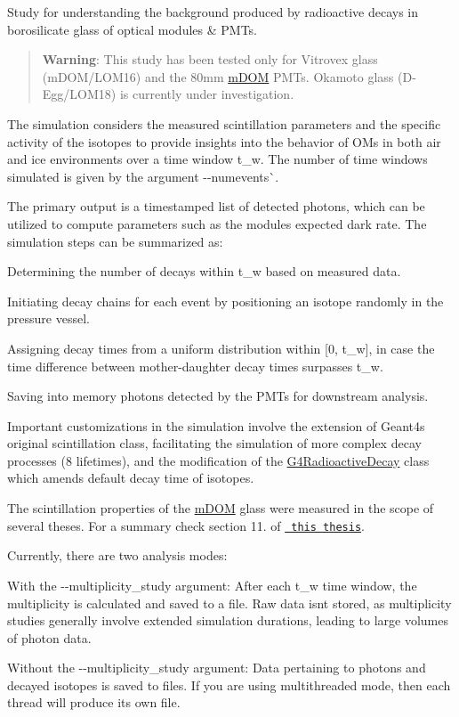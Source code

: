 Study for understanding the background produced by radioactive decays in borosilicate glass of optical modules \& PMTs.

\begin{quote}
{\bfseries{Warning}}\+: This study has been tested only for Vitrovex glass (m\+DOM/\+LOM16) and the 80mm \mbox{\hyperlink{classm_d_o_m}{m\+DOM}} PMTs. Okamoto glass (D-\/\+Egg/\+LOM18) is currently under investigation. \end{quote}
The simulation considers the measured scintillation parameters and the specific activity of the isotopes to provide insights into the behavior of OMs in both air and ice environments over a time window t\+\_\+w. The number of time windows simulated is given by the argument {\ttfamily -\/-\/numevents}\`{}.

The primary output is a timestamped list of detected photons, which can be utilized to compute parameters such as the module\textquotesingle{}s expected dark rate. The simulation steps can be summarized as\+:


\begin{DoxyItemize}
\item Determining the number of decays within t\+\_\+w based on measured data.
\item Initiating decay chains for each event by positioning an isotope randomly in the pressure vessel.
\item Assigning decay times from a uniform distribution within \mbox{[}0, t\+\_\+w\mbox{]}, in case the time difference between mother-\/daughter decay times surpasses t\+\_\+w.
\item Saving into memory photons detected by the PMTs for downstream analysis.
\end{DoxyItemize}

Important customizations in the simulation involve the extension of Geant4\textquotesingle{}s original scintillation class, facilitating the simulation of more complex decay processes (8 lifetimes), and the modification of the \mbox{\hyperlink{class_g4_radioactive_decay}{G4\+Radioactive\+Decay}} class which amends default decay time of isotopes.

The scintillation properties of the \mbox{\hyperlink{classm_d_o_m}{m\+DOM}} glass were measured in the scope of several theses. For a summary check section 11. of \href{https://zenodo.org/record/8121321}{\texttt{ this thesis}}.

Currently, there are two analysis modes\+:


\begin{DoxyEnumerate}
\item With the {\ttfamily -\/-\/multiplicity\+\_\+study} argument\+: After each t\+\_\+w time window, the multiplicity is calculated and saved to a file. Raw data isn\textquotesingle{}t stored, as multiplicity studies generally involve extended simulation durations, leading to large volumes of photon data.
\item Without the {\ttfamily -\/-\/multiplicity\+\_\+study} argument\+: Data pertaining to photons and decayed isotopes is saved to files. If you are using multithreaded mode, then each thread will produce its own file. 
\end{DoxyEnumerate}